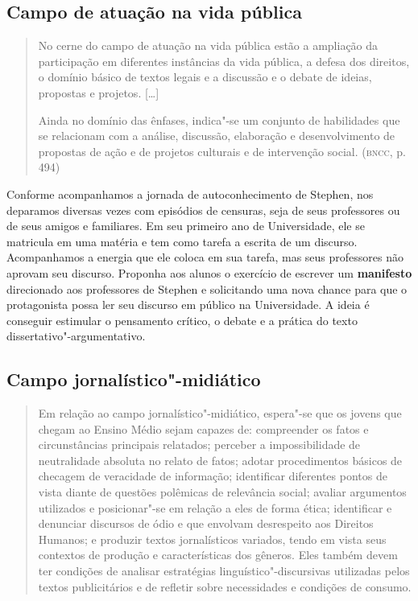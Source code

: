 \documentclass[12pt]{extarticle}
\begin{document}
{\subsection{Campo de atuação na vida pública}

\begin{quote}
No cerne do campo de atuação na vida pública estão a ampliação da
participação em diferentes instâncias da vida pública, a defesa dos
direitos, o domínio básico de textos legais e a discussão e o debate de
ideias, propostas e projetos. {[}\ldots{}{]}

Ainda no domínio das ênfases, indica"-se um conjunto de habilidades que
se relacionam com a análise, discussão, elaboração e desenvolvimento de
propostas de ação e de projetos culturais e de intervenção social.
(\textsc{bncc}, p. 494)
\end{quote}

Conforme acompanhamos a jornada de autoconhecimento de Stephen, nos
deparamos diversas vezes com episódios de censuras, seja de seus
professores ou de seus amigos e familiares. Em seu primeiro ano de
Universidade, ele se matricula em uma matéria e tem como tarefa a
escrita de um discurso. Acompanhamos a energia que ele coloca em sua
tarefa, mas seus professores não aprovam seu discurso. Proponha aos
alunos o exercício de escrever um \textbf{manifesto} direcionado aos
professores de Stephen e solicitando uma nova chance para que o
protagonista possa ler seu discurso em público na Universidade. A
ideia é conseguir estimular o pensamento crítico, o debate e a prática
do texto dissertativo"-argumentativo.

\subsection{Campo jornalístico"-midiático}

\begin{quote}
Em relação ao campo jornalístico"-midiático, espera"-se que os jovens
que chegam ao Ensino Médio sejam capazes de: compreender os fatos e
circunstâncias principais relatados; perceber a impossibilidade de
neutralidade absoluta no relato de fatos; adotar procedimentos básicos
de checagem de veracidade de informação; identificar diferentes pontos
de vista diante de questões polêmicas de relevância social; avaliar
argumentos utilizados e posicionar"-se em relação a eles de forma ética;
identificar e denunciar discursos de ódio e que envolvam desrespeito aos
Direitos Humanos; e produzir textos jornalísticos variados, tendo em
vista seus contextos de produção e características dos gêneros. Eles
também devem ter condições de analisar estratégias
linguístico"-discursivas utilizadas pelos textos publicitários e de
refletir sobre necessidades e condições de consumo.


\end{quote}}
\end{document}
